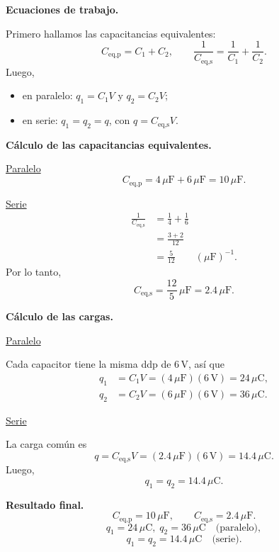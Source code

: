 \documentclass[11pt]{article}
\begin{document}
\textbf{Ecuaciones de trabajo.}

Primero hallamos las capacitancias equivalentes:
\begin{equation*}
    C_{\text{eq,p}}=C_1+C_2,
    \qquad
    \frac{1}{C_{\text{eq,s}}}=\frac{1}{C_1}+\frac{1}{C_2}.
\end{equation*}
Luego,
\begin{itemize}
    \item en paralelo: $q_1=C_1V$ y $q_2=C_2V$;
    \item en serie: $q_1=q_2=q$, con $q=C_{\text{eq,s}}V$.
\end{itemize}

\textbf{C\'alculo de las capacitancias equivalentes.}

\underline{Paralelo}
\begin{equation*}
    C_{\text{eq,p}}=4\,\mu\text{F}+6\,\mu\text{F}=10\,\mu\text{F}.
\end{equation*}

\underline{Serie}
\begin{align*}
    \frac{1}{C_{\text{eq,s}}}
    &=\frac{1}{4}+\frac{1}{6}\\
    &=\frac{3+2}{12}\\
    &=\frac{5}{12}
    \qquad (\mu\text{F})^{-1}.
\end{align*}
Por lo tanto,
\begin{equation*}
    C_{\text{eq,s}}=\frac{12}{5}\,\mu\text{F}=2.4\,\mu\text{F}.
\end{equation*}

\textbf{C\'alculo de las cargas.}

\underline{Paralelo}

Cada capacitor tiene la misma ddp de $6\,\text{V}$, as\'i que
\begin{align*}
    q_1&=C_1V=(4\,\mu\text{F})(6\,\text{V})=24\,\mu\text{C},\\
    q_2&=C_2V=(6\,\mu\text{F})(6\,\text{V})=36\,\mu\text{C}.
\end{align*}

\underline{Serie}

La carga com\'un es
\begin{equation*}
    q=C_{\text{eq,s}}V=(2.4\,\mu\text{F})(6\,\text{V})=14.4\,\mu\text{C}.
\end{equation*}
Luego,
\begin{equation*}
    q_1=q_2=14.4\,\mu\text{C}.
\end{equation*}

\textbf{Resultado final.}
\begin{equation*}
    \boxed{C_{\text{eq,p}}=10\,\mu\text{F}},
    \qquad
    \boxed{C_{\text{eq,s}}=2.4\,\mu\text{F}}.
\end{equation*}
\begin{equation*}
    \boxed{q_1=24\,\mu\text{C},\; q_2=36\,\mu\text{C}\quad \text{(paralelo)}},
\end{equation*}
\begin{equation*}
    \boxed{q_1=q_2=14.4\,\mu\text{C}\quad \text{(serie)}}.
\end{equation*}
\end{document}
